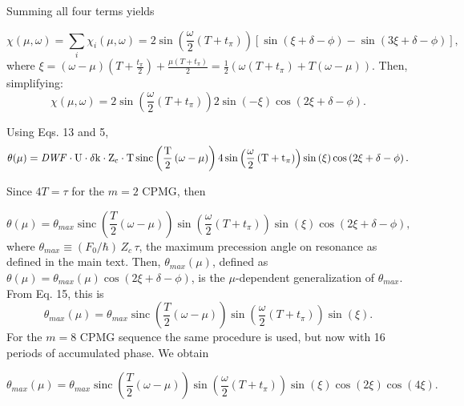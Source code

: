 \documentclass[aps,prl,onecolumn,superscriptaddress,floatfix]{revtex4-1}
\DeclareMathOperator{\sinc}{sinc}
\begin{document}
Summing all four terms yields

\begin{equation}
\chi(\mu,\omega) = \sum_{i} \chi_i(\mu,\omega) = 2 \sin \left( \frac{\omega}{2}\left( T + t_{\pi} \right) \right) \left[ \sin \left( \xi + \delta-\phi \right) - \sin \left( 3\xi + \delta-\phi \right) \right],
\end{equation}
where $\xi = (\omega-\mu)(T+\frac{t_{\pi}}{2})+\frac{\mu(T+t_{\pi})}{2} = \frac{1}{2}\left( \omega (T+t_{\pi}) + T \left( \omega-\mu \right) \right)$.
Then, simplifying:
\begin{equation}
\chi(\mu,\omega) = 2 \sin \left( \frac{\omega}{2}\left( T + t_{\pi} \right) \right) 2 \sin \left(- \xi \right) \cos \left( 2 \xi + \delta-\phi \right).
\end{equation}

Using Eqs. 13 and 5,
\begin{equation}
\theta(\mu) = \rm{\it{DWF}} \cdot U \cdot \delta k \cdot Z_c \cdot T \sinc \left( \frac{T}{2}\left(\omega-\mu \right) \right) 4 \sin \left( \frac{\omega}{2}\left( T + t_{\pi} \right) \right) \sin \left( \xi \right) \cos \left( 2 \xi + \delta-\phi \right).
\end{equation}

Since $4T = \tau$ for the $m = 2$ CPMG, then

\begin{equation}
\theta(\mu) = \theta_{max} \sinc \left( \frac{T}{2}\left(\omega-\mu \right) \right) \sin \left( \frac{\omega}{2}\left( T + t_{\pi} \right) \right) \sin \left( \xi \right) \cos \left( 2 \xi + \delta-\phi \right),
\end{equation}
where $\theta_{max} \equiv (F_{0}/\hbar)\, Z_c \, \tau$, the maximum precession angle on resonance as defined in the main text. Then, $\theta_{max}(\mu)$, defined as $\theta(\mu) = \theta_{max}(\mu) \cos \left( 2 \xi + \delta-\phi \right)$, is the $\mu$-dependent generalization of $\theta_{max}$. From Eq. 15, this is
\begin{equation}
\theta_{max}(\mu) = \theta_{max} \sinc \left( \frac{T}{2}\left(\omega-\mu \right) \right) \sin \left( \frac{\omega}{2}\left( T + t_{\pi} \right) \right) \sin \left( \xi \right).
\end{equation}
For the $m = 8$ CPMG sequence the same procedure is used, but now with 16 periods of accumulated phase. We obtain

\begin{widetext}
\begin{equation}
\theta_{max}(\mu) = \theta_{max}  \sinc\left( \frac{T}{2} \left( \omega-\mu \right) \right) \sin\left( \frac{\omega}{2} \left( T+t_{\pi} \right) \right) \sin(\xi)\cos(2 \xi)\cos(4 \xi).
\end{equation}
\end{widetext} 
\end{document}
